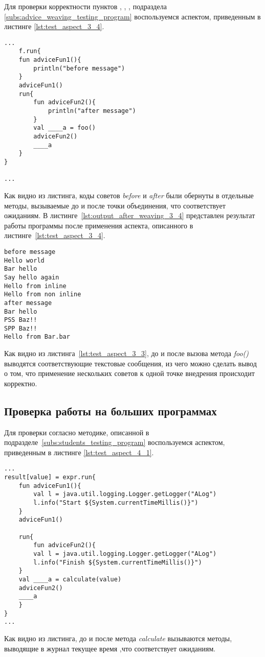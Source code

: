 Для проверки корректности пунктов \quotes{\ref{list:before_advice_weaving_check}},
\quotes{\ref{list:after_advice_weaving_check}},
\quotes{\ref{list:several_advices_weaving_check}},
\quotes{\ref{list:program_work_check}}  подраздела \ref{subs:advice_weaving_testing_program} воспользуемся аспектом, приведенным в листинге \ref{lst:test_aspect_3_4}.
\begin{lstlisting}[style={java}, label={lst:result_of_weaving_3_4},
 caption={Результат применения аспекта, описанного в листинге~\ref{lst:test_aspect_3_4}, к тестовой программе}]
...
    f.run{
    fun adviceFun1(){
        println("before message")
    }
	adviceFun1()
	run{
		fun adviceFun2(){
	        println("after message")
    	}
		val ____a = foo()
		adviceFun2()
		____a
	}
}

...
\end{lstlisting}
Как видно из листинга, коды советов \textit{before} и \textit{after} были обернуты в отдельные методы, вызываемые до и после точки объединения, что соответствует ожиданиям.
В листинге~\ref{lst:output_after_weaving_3_4} представлен результат работы программы после применения аспекта, описанного в листинге~\ref{lst:test_aspect_3_4}. 
\begin{lstlisting}[style={java}, label={lst:output_after_weaving_3_4},
 caption={Результат работы программы после применения аспекта, описанного в листинге~\ref{lst:test_aspect_3_4}}]
before message
Hello world
Bar hello
Say hello again
Hello from inline
Hello from non inline
after message
Bar hello
PSS Baz!!
SPP Baz!!
Hello from Bar.bar
\end{lstlisting}
Как видно из листинга~\ref{lst:test_aspect_3_3}, до и после вызова метода \textit{foo()} выводятся соответствующие текстовые сообщения, из чего можно сделать вывод о том, что применение нескольких советов к одной точке внедрения происходит корректно.
\subsection{Проверка работы на больших программах}
\label{sub:students_weaving_tests}
Для проверки согласно методике, описанной в подразделе~\ref{subs:students_testing_program} воспользуемся аспектом, приведенным в листинге \ref{lst:test_aspect_4_1}.
\begin{lstlisting}[style={java}, label={lst:result_of_weaving_4_1},
 caption={Результат применения аспекта, описанного в листинге~\ref{lst:test_aspect_4_1}, к тестовой программе}]
...
result[value] = expr.run{
	fun adviceFun1(){
    	val l = java.util.logging.Logger.getLogger("ALog")
    	l.info("Start ${System.currentTimeMillis()}")
  	}
	adviceFun1()
	
	run{
		fun adviceFun2(){
    	val l = java.util.logging.Logger.getLogger("ALog")
    	l.info("Finish ${System.currentTimeMillis()}")
  	}
	val ____a = calculate(value)
	adviceFun2()
	____a
	}
}
...
\end{lstlisting}
Как видно из листинга, до и после метода \textit{calculate} вызываются методы, выводящие в журнал текущее время ,что соответствует ожиданиям.

